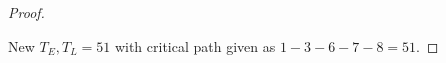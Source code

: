 \documentclass[oneside,11pt,pdftex]{book}%
\numberwithin{equation}{section}
\numberwithin{section}{chapter}
\numberwithin{equation}{chapter}
\begin{document}
\begin{proof}
\begin{center}
\begin{tikzpicture}[x=0.75pt,y=0.75pt,yscale=-1,xscale=1]
		
	\end{tikzpicture}
	
\end{center}
New $ T_E,T_L=51 $ with critical path given as $ 1-3-6-7-8=51$.


\end{proof}



\backmatter


\thispagestyle{empty}%
{\ }
\newpage
\end{document}
